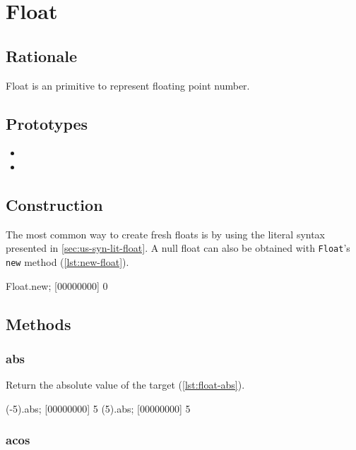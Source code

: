 \section{Float}

\subsection{Rationale}

Float is an \us primitive to represent floating point number.

\subsection{Prototypes}

\begin{itemize}
\item {}
\item {}
\end{itemize}

\subsection{Construction}

The most common way to create fresh floats is by using the literal
syntax presented in \autoref{sec:us-syn-lit-float}. A null float can also be
obtained with \lstinline|Float|'s \lstinline|new| method
(\autoref{lst:new-float}).

\begin{urbiscript}[caption=Creating a new float, label=lst:new-float,
  float=\floatpos]
Float.new;
[00000000] 0
\end{urbiscript}

\subsection{Methods}

\subsubsection{abs}

Return the absolute value of the target (\autoref{lst:float-abs}).

\begin{urbiscript}[caption=Float.abs, label=lst:float-abs]
(-5).abs;
[00000000] 5
(5).abs;
[00000000] 5
\end{urbiscript}

\subsubsection{acos}

